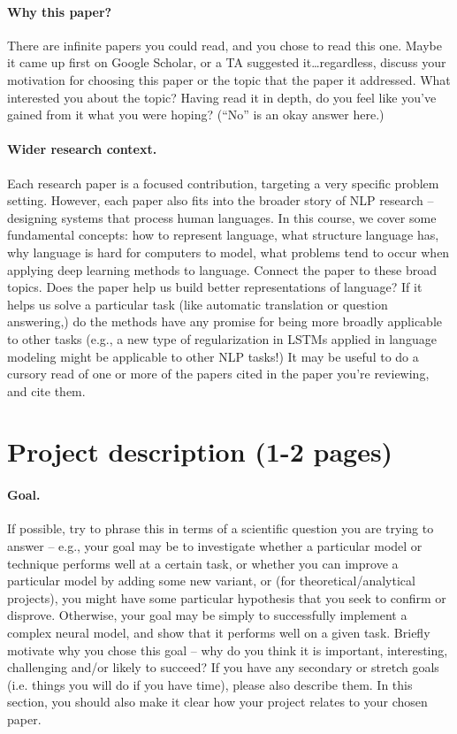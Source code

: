 \documentclass{article}
\begin{document}
\paragraph{Why this paper?}
There are infinite papers you could read, and you chose to read this one.
Maybe it came up first on Google Scholar, or a TA suggested it\dots regardless, discuss your motivation for choosing this paper or the topic that the paper it addressed.
What interested you about the topic?
Having read it in depth, do you feel like you've gained from it what you were hoping? (``No'' is an okay answer here.)

\paragraph{Wider research context.}
Each research paper is a focused contribution, targeting a very specific problem setting.
However, each paper also fits into the broader story of NLP research -- designing systems that process human languages.
In this course, we cover some fundamental concepts: how to represent language, what structure language has, why language is hard for computers to model, what problems tend to occur when applying deep learning methods to language.
Connect the paper to these broad topics.
Does the paper help us build better representations of language?
If it helps us solve a particular task (like automatic translation or question answering,) do the methods have any promise for being more broadly applicable to other tasks (e.g., a new type of regularization in LSTMs applied in language modeling might be applicable to other NLP tasks!)
It may be useful to do a cursory read of one or more of the papers cited in the paper you're reviewing, and cite them.


\section{Project description (1-2 pages)}

\paragraph{Goal.} 
If possible, try to phrase this in terms of a scientific question you are trying to answer -- e.g., your goal may be to investigate whether a particular model or technique performs well at a certain task, or whether you can improve a particular model by adding some new variant, or (for theoretical/analytical projects), you might have some particular hypothesis that you seek to confirm or disprove.
Otherwise, your goal may be simply to successfully implement a complex neural model, and show that it performs well on a given task.
Briefly motivate why you chose this goal -- why do you think it is important, interesting, challenging and/or likely to succeed?
If you have any secondary or stretch goals (i.e. things you will do if you have time), please also describe them.
In this section, you should also make it clear how your project relates to your chosen paper.
\end{document}
